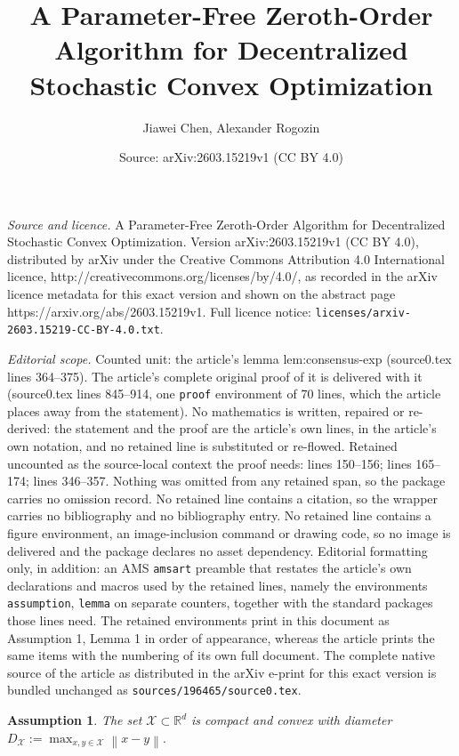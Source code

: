\documentclass[10pt,a4paper]{amsart}
\title{A Parameter-Free Zeroth-Order Algorithm for Decentralized Stochastic Convex Optimization}
\author{Jiawei Chen, Alexander Rogozin}
\date{Source: arXiv:2603.15219v1 (CC BY 4.0)}
\newtheorem{assumption}{Assumption}
\newcommand{\R}{\mathbb{R}}
\newcommand{\norm}[1]{\left\lVert #1 \right\rVert}
\begin{document}
\maketitle

\noindent\emph{Source and licence.} A Parameter-Free Zeroth-Order Algorithm for Decentralized Stochastic Convex Optimization. Version arXiv:2603.15219v1 (CC BY 4.0), distributed by arXiv under the Creative Commons Attribution 4.0 International licence, http://creativecommons.org/licenses/by/4.0/, as recorded in the arXiv licence metadata for this exact version and shown on the abstract page https://arxiv.org/abs/2603.15219v1. Full licence notice: \texttt{licenses/arxiv-2603.15219-CC-BY-4.0.txt}.\par\smallskip

\noindent\textit{Editorial scope.} Counted unit: the article's lemma lem:consensus-exp (source0.tex lines 364--375). The article's complete original proof of it is delivered with it (source0.tex lines 845--914, one \texttt{proof} environment of 70 lines, which the article places away from the statement). No mathematics is written, repaired or re-derived: the statement and the proof are the article's own lines, in the article's own notation, and no retained line is substituted or re-flowed.  Retained uncounted as the source-local context the proof needs: lines 150--156; lines 165--174; lines 346--357.  Nothing was omitted from any retained span, so the package carries no omission record.  No retained line contains a citation, so the wrapper carries no bibliography and no bibliography entry.  No retained line contains a figure environment, an image-inclusion command or drawing code, so no image is delivered and the package declares no asset dependency.  Editorial formatting only, in addition: an AMS \texttt{amsart} preamble that restates the article's own declarations and macros used by the retained lines, namely the environments \texttt{assumption}, \texttt{lemma} on separate counters, together with the standard packages those lines need.  The retained environments print in this document as Assumption 1, Lemma 1 in order of appearance, whereas the article prints the same items with the numbering of its own full document.  The complete native source of the article as distributed in the arXiv e-print for this exact version is bundled unchanged as \texttt{sources/196465/source0.tex}.
\begin{assumption}
\label{ass:domain}
The set $\mathcal{X} \subset \R^d$ is compact and convex with diameter
\(
D_{\mathcal{X}} := \max_{x,y \in \mathcal{X}} \norm{x-y}.
\)
\end{assumption}
\end{document}
